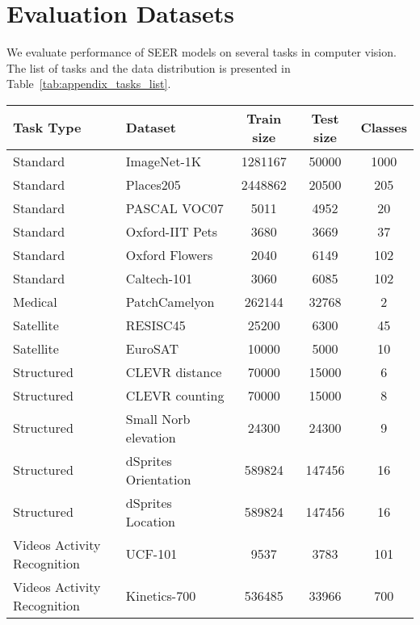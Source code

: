 \documentclass[10pt,twocolumn,letterpaper]{article}
\begin{document}
\section{Evaluation Datasets}
We evaluate performance of SEER models on several tasks in computer vision. The list of tasks and the data distribution is presented in Table~\ref{tab:appendix_tasks_list}. 



\begin{table*}[t]
  \centering
  
  \begin{tabular}{@{}l l c c c @{}}
  
  \toprule
    \textbf{Task Type} & \textbf{Dataset} & \textbf{Train size} & \textbf{Test size} & \textbf{Classes}  \\
    
    
    \midrule
    Standard & ImageNet-1K & 1281167 & 50000 & 1000 \\
    Standard & Places205 & 2448862  & 20500 & 205 \\
    Standard & PASCAL VOC07 & 5011 & 4952 & 20 \\
    Standard & Oxford-IIT Pets & 3680 & 3669 & 37 \\
    Standard & Oxford Flowers & 2040 & 6149 & 102 \\
    Standard & Caltech-101 & 3060 & 6085 & 102 \\
    
    \midrule
    Medical & PatchCamelyon & 262144 & 32768 & 2 \\
    Satellite & RESISC45 & 25200 & 6300 & 45 \\
    Satellite & EuroSAT & 10000 & 5000 & 10 \\
    
    
    \midrule
    Structured & CLEVR distance & 70000 & 15000 & 6 \\
    Structured & CLEVR counting & 70000 & 15000 & 8 \\
    Structured & Small Norb elevation & 24300 & 24300 & 9 \\
    Structured & dSprites Orientation & 589824 & 147456 & 16 \\
    Structured & dSprites Location & 589824 & 147456 & 16 \\
    
    \midrule
    Videos Activity Recognition & UCF-101 & 9537 & 3783 & 101 \\
    Videos Activity Recognition & Kinetics-700 & 536485 & 33966 & 700 \\
    

\end{tabular}
\end{table*}
\end{document}
